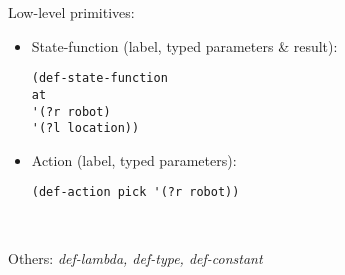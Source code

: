 \begin{column}{0.45\textwidth}
    Low-level primitives:
    \tiny
    \begin{itemize}
        \setlength
        \item State-function (label, typed parameters \& result):
        \begin{lstlisting}
(def-state-function
at
'(?r robot)
'(?l location))
        \end{lstlisting}
        \item Action (label, typed parameters):
        
        \begin{lstlisting}
(def-action pick '(?r robot))
        \end{lstlisting}
    \end{itemize}

    ~

    \normal
Others: \textit{def-lambda, def-type, def-constant}
\end{column}